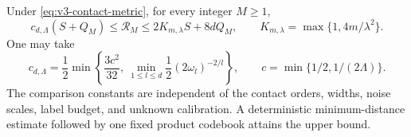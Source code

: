 \begin{theorem}
\label{thm:v3-contact}
Under \eqref{eq:v3-contact-metric}, for every integer $M\ge1$,
\begin{equation}\label{eq:v3-contact-law}
 c_{d,\Lambda}(S+Q_M)\le\mathcal R_M
       \le 2K_{m,\lambda}S+8dQ_M,
 \qquad K_{m,\lambda}=\max\{1,4m/\lambda^2\}.
\end{equation}
One may take
\[
 c_{d,\Lambda}=\frac12\min\left\{
 \frac{3c^2}{32},\
 \min_{1\le l\le d}\frac12(2\omega_l)^{-2/l}\right\},
 \qquad c=\min\{1/2,1/(2\Lambda)\}.
\]
The comparison constants are independent of the contact orders, widths,
noise scales, label budget, and unknown calibration. A deterministic
minimum-distance estimate followed by one fixed product codebook attains
the upper bound.
\end{theorem}
